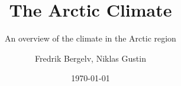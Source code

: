 
\title{The Arctic Climate}

\subtitle{An overview of the climate in the Arctic region}

\author{Fredrik Bergelv, Niklas Gustin}

\date{\today}

\newcommand{\IncludeBib}{y} 